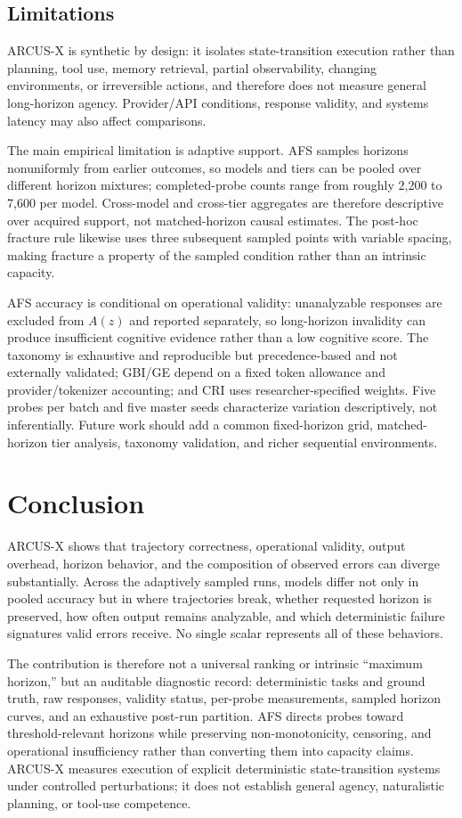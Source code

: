 \documentclass{article}
\begin{document}
\subsection{Limitations}
ARCUS-X is synthetic by design: it isolates state-transition execution rather than planning, tool use, memory retrieval, partial observability, changing environments, or irreversible actions, and therefore does not measure general long-horizon agency. Provider/API conditions, response validity, and systems latency may also affect comparisons.

The main empirical limitation is adaptive support. AFS samples horizons nonuniformly from earlier outcomes, so models and tiers can be pooled over different horizon mixtures; completed-probe counts range from roughly 2{,}200 to 7{,}600 per model. Cross-model and cross-tier aggregates are therefore descriptive over acquired support, not matched-horizon causal estimates. The post-hoc fracture rule likewise uses three subsequent sampled points with variable spacing, making fracture a property of the sampled condition rather than an intrinsic capacity.

AFS accuracy is conditional on operational validity: unanalyzable responses are excluded from $A(z)$ and reported separately, so long-horizon invalidity can produce insufficient cognitive evidence rather than a low cognitive score. The taxonomy is exhaustive and reproducible but precedence-based and not externally validated; GBI/GE depend on a fixed token allowance and provider/tokenizer accounting; and CRI uses researcher-specified weights. Five probes per batch and five master seeds characterize variation descriptively, not inferentially. Future work should add a common fixed-horizon grid, matched-horizon tier analysis, taxonomy validation, and richer sequential environments.
\section{Conclusion}


ARCUS-X shows that trajectory correctness, operational validity, output overhead, horizon behavior, and the composition of observed errors can diverge substantially. Across the adaptively sampled runs, models differ not only in pooled accuracy but in where trajectories break, whether requested horizon is preserved, how often output remains analyzable, and which deterministic failure signatures valid errors receive. No single scalar represents all of these behaviors.

The contribution is therefore not a universal ranking or intrinsic ``maximum horizon,'' but an auditable diagnostic record: deterministic tasks and ground truth, raw responses, validity status, per-probe measurements, sampled horizon curves, and an exhaustive post-run partition. AFS directs probes toward threshold-relevant horizons while preserving non-monotonicity, censoring, and operational insufficiency rather than converting them into capacity claims. ARCUS-X measures execution of explicit deterministic state-transition systems under controlled perturbations; it does not establish general agency, naturalistic planning, or tool-use competence.
\end{document}
